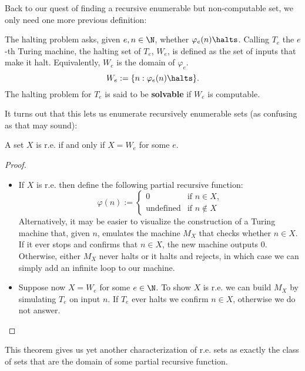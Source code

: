 \documentclass[../main.tex]{memoir}
\begin{document}
Back to our quest of finding a recursive enumerable but non-computable set, we only need one more previous definition:

\begin{definition}
  The halting problem asks, given $e, n \in \N$, whether $\varphi_e(n) \halts$. Calling $T_e$ the $e$-th Turing machine, the halting set of $T_e$, $W_e$, is defined as the set of inputs that make it halt. Equivalently, $W_e$ is the domain of $\varphi_e$.
  \[ W_e := \{n : \varphi_e(n) \halts\}. \]
  The halting problem for $T_e$ is said to be \textbf{solvable} if $W_e$ is computable.
\end{definition}

It turns out that this lets us enumerate recursively enumerable sets (as confusing as that may sound):

\begin{theorem}
  A set $X$ is r.e. if and only if $X = W_e$ for some $e$.
\end{theorem}
\begin{proof}
  \begin{itemize}
  \item If $X$ is r.e. then define the following partial recursive function:
    \begin{equation*}
      \varphi(n) := \left\{
        \begin{array}{lr}
          0 & \text{if } n \in X \text{,} \\
          \text{undefined} & \text{if } n \not\in X
        \end{array}\right.
    \end{equation*}
    Alternatively, it may be easier to visualize the construction of a Turing machine that, given $n$, emulates the machine $M_X$ that checks whether $n \in X$. If it ever stops and confirms that $n \in X$, the new machine outputs $0$. Otherwise, either $M_X$ never halts or it halts and rejects, in which case we can simply add an infinite loop to our machine.
  \item Suppose now $X = W_e$ for some $e \in \N$. To show $X$ is r.e. we can build $M_X$ by simulating $T_e$ on input $n$. If $T_e$ ever halts we confirm $n \in X$, otherwise we do not answer.
  \end{itemize}
\end{proof}

\begin{remark}
  This theorem gives us yet another characterization of r.e. sets as exactly the class of sets that are the domain of some partial recursive function.
\end{remark}
\end{document}
